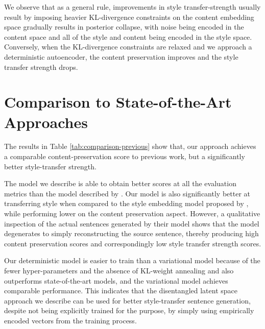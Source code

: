 We observe that as a general rule, improvements in style transfer-strength usually result by imposing heavier KL-divergence constraints on the content embedding space gradually results in posterior collapse, with noise being encoded in the content space and all of the style and content being encoded in the style space. Conversely, when the KL-divergence constraints are relaxed and we approach a deterministic autoencoder, the content preservation improves and the style transfer strength drops.


\section{Comparison to State-of-the-Art Approaches}

The results in Table \ref{tab:comparison-previous} show that, our approach achieves a comparable content-preservation score to previous work, but a significantly better style-transfer strength.

The model we describe is able to obtain better scores at all the evaluation metrics than the model described by \cite{shen2017style}. Our model is also significantly better at transferring style when compared to the style embedding model proposed by \cite{fu2017style}, while performing lower on the content preservation aspect. However, a qualitative inspection of the actual sentences generated by their model shows that the model degenerates to simply reconstructing the source sentence, thereby producing high content preservation scores and correspondingly low style transfer strength scores.

Our deterministic model is easier to train than a variational model because of the fewer hyper-parameters and the absence of KL-weight annealing  and also outperforms state-of-the-art models, and the variational model achieves comparable performance. This indicates that the disentangled latent space approach we describe can be used for better style-transfer sentence generation, despite not being explicitly trained for the purpose, by simply using empirically encoded vectors from the training process.
